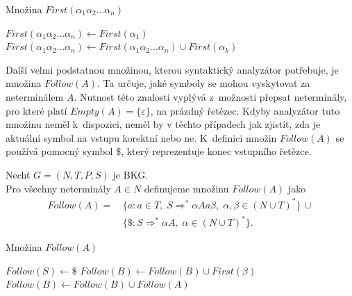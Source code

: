 \begin{algorithm}
    \caption{Množina $First(\alpha_1\alpha_2\ldots\alpha_n)$}
    \label{alg_mnozina_first_vicn}
    \begin{algorithmic}[1]
        \NewLine
        \State $First(\alpha_1\alpha_2\ldots \alpha_n) \gets First(\alpha_1)$
                \State $First(\alpha_1\alpha_2\ldots\alpha_n) \gets First(\alpha_1\alpha_2\ldots\alpha_n) \cup First(\alpha_k)$
            \EndIf
        \EndWhile
    \end{algorithmic}
\end{algorithm}

Další velmi podstatnou množinou, kterou syntaktický analyzátor potřebuje, je množina $Follow(A)$.
Ta určuje, jaké symboly se mohou vyskytovat za neterminálem $A$.
Nutnost této znalosti vyplývá z~možnosti přepsat neterminály, pro které platí $Empty(A) = \{\varepsilon\}$, na prázdný řetězec.
Kdyby analyzátor tuto množinu neměl k~dispozici, neměl by v těchto případech jak zjistit, zda je aktuální symbol na vstupu korektní nebo ne.
K~definici množin $Follow(A)$ se používá pomocný symbol \$, který reprezentuje konec vstupního řetězce.
\begin{definition}\label{def_mnozina_follow}
    Nechť $G = (N, T, P, S)$ je BKG.\\
    Pro všechny neterminály $A \in N$ definujeme množinu $Follow(A)$ jako
    \begin{align*}
        Follow(A) = \,&\{a: a \in T,\; S \Rightarrow^* \alpha Aa\beta,\; \alpha, \beta \in (N \cup T)^*\}\, \cup \\
                      &\{\$: S \Rightarrow^* \alpha A,\; \alpha \in (N \cup T)^*\}.
    \end{align*}
\end{definition}
\begin{algorithm}[h!]
    \caption{Množina $Follow(A)$}
    \label{alg_mnozina_follow}
    \begin{algorithmic}[1]
        \NewLine
        \State $Follow(S) \gets \$$
                \If{$\beta \neq \varepsilon$}
                    \State $Follow(B) \gets Follow(B) \cup First(\beta)$
                \EndIf
                    \State $Follow(B) \gets Follow(B) \cup Follow(A)$
                \EndIf
            \EndIf
        \EndWhile 
    \end{algorithmic}
\end{algorithm}

